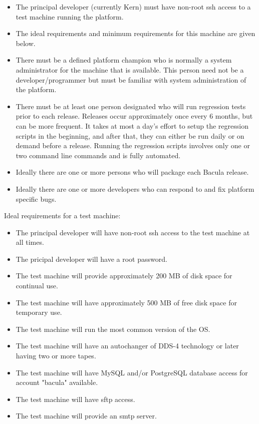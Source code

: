 \begin{itemize}
\item The principal developer (currently Kern) must have
   non-root ssh access to a test machine running the platform.
\item The ideal requirements and minimum requirements
   for this machine are given below.
\item There must be a defined platform champion who is normally
   a system administrator for the machine that is available. This
   person need not be a developer/programmer but must be familiar
   with system administration of the platform.
\item There must be at least one person designated who will
   run regression tests prior to each release.  Releases occur
   approximately once every 6 months, but can be more frequent.
   It takes at most a day's effort to setup the regression scripts
   in the beginning, and after that, they can either be run daily
   or on demand before a release. Running the regression scripts
   involves only one or two command line commands and is fully
   automated.
\item Ideally there are one or more persons who will package
   each Bacula release.
\item Ideally there are one or more developers who can respond to
   and fix platform specific bugs.
\end{itemize}

Ideal requirements for a test machine:
\begin{itemize}
\item The principal developer will have non-root ssh access to
  the test machine at all times.
\item The pricipal developer will have a root password.
\item The test machine will provide approximately 200 MB of
  disk space for continual use.
\item The test machine will have approximately 500 MB of free
  disk space for temporary use.
\item The test machine will run the most common version of the OS.
\item The test machine will have an autochanger of DDS-4 technology
  or later having two or more tapes.
\item The test machine will have MySQL and/or PostgreSQL database
  access for account "bacula" available.
\item The test machine will have sftp access.
\item The test machine will provide an smtp server.
\end{itemize}

